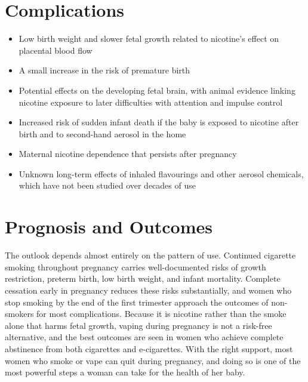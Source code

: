 \section*{Complications}
\begin{itemize}
    \item Low birth weight and slower fetal growth related to nicotine's effect on placental blood flow
    \item A small increase in the risk of premature birth
    \item Potential effects on the developing fetal brain, with animal evidence linking nicotine exposure to later difficulties with attention and impulse control
    \item Increased risk of sudden infant death if the baby is exposed to nicotine after birth and to second-hand aerosol in the home
    \item Maternal nicotine dependence that persists after pregnancy
    \item Unknown long-term effects of inhaled flavourings and other aerosol chemicals, which have not been studied over decades of use
\end{itemize}

\section*{Prognosis and Outcomes}
The outlook depends almost entirely on the pattern of use. Continued cigarette smoking throughout pregnancy carries well-documented risks of growth restriction, preterm birth, low birth weight, and infant mortality. Complete cessation early in pregnancy reduces these risks substantially, and women who stop smoking by the end of the first trimester approach the outcomes of non-smokers for most complications. Because it is nicotine rather than the smoke alone that harms fetal growth, vaping during pregnancy is not a risk-free alternative, and the best outcomes are seen in women who achieve complete abstinence from both cigarettes and e-cigarettes. With the right support, most women who smoke or vape can quit during pregnancy, and doing so is one of the most powerful steps a woman can take for the health of her baby.

